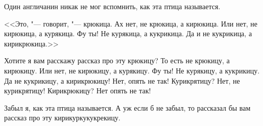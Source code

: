 Один англичанин никак не мог вспомнить, как эта птица называется.

<<Это, "--- говорит, "--- крюкица. Ах нет, не крюкица, а кирюкица. Или нет, не кирюкица, а курякица. Фу ты! Не курякица, а кукрикица. Да и не кукрикица, а кирикрюкица.>>

Хотите я вам расскажу рассказ про эту крюкицу? То есть не крюкицу, а кирюкицу. Или нет, не кирюкицу, а курякицу. Фу ты! Не курякицу, а кукрикицу. Да не кукрикицу, а кирикрюкицу! Нет, опять не так! Курикрятицу? Нет, не курикрятицу! Кирикрюкицу? Нет опять не так!

Забыл я, как эта птица называется. А уж если б не забыл, то рассказал бы вам рассказ про эту кирикуркукукрекицу.